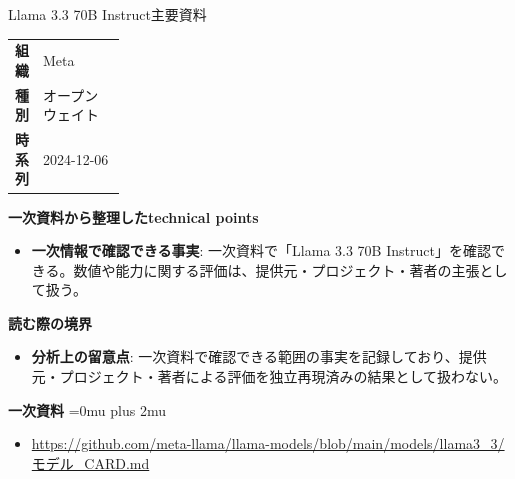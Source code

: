 \begin{technicalnote}{Llama 3.3 70B Instruct}{主要資料}
\begingroup
\begin{tabularx}{\linewidth}{@{}>{\bfseries}p{0.22\linewidth}X@{}}
組織 & Meta \\
種別 & オープンウェイト \\
時系列 & 2024-12-06 \\
\end{tabularx}
\smallskip
{\bfseries 一次資料から整理したtechnical points}
\begin{itemize}[leftmargin=1.5em,itemsep=0.35em]
\item \textbf{一次情報で確認できる事実}: 一次資料で「Llama 3.3 70B Instruct」を確認できる。数値や能力に関する評価は、提供元・プロジェクト・著者の主張として扱う。
\end{itemize}
\begin{minipage}{\linewidth}
{\bfseries 読む際の境界}
\begin{itemize}[leftmargin=1.5em,itemsep=0.35em]
\item \textbf{分析上の留意点}: 一次資料で確認できる範囲の事実を記録しており、提供元・プロジェクト・著者による評価を独立再現済みの結果として扱わない。
\end{itemize}
\begin{samepage}
{\bfseries 一次資料}
\begingroup\sloppy
\Urlmuskip=0mu plus 2mu\relax
\begin{itemize}[leftmargin=1.5em,itemsep=0.25em]
\item {\scriptsize\url{https://github.com/meta-llama/llama-models/blob/main/models/llama3_3/モデル_CARD.md}}
\end{itemize}
\endgroup
\end{samepage}
\end{minipage}
\endgroup
\end{technicalnote}
\medskip

